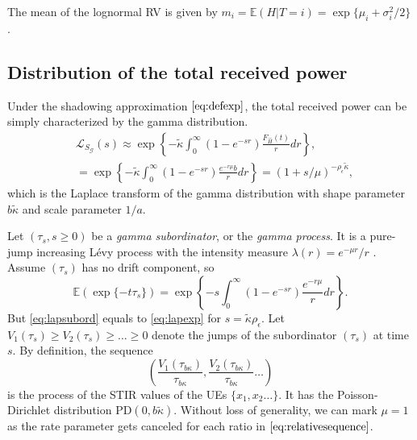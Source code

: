 \documentclass[lettersize,journal]{IEEEtran}
\begin{document}
The mean of the lognormal RV is given by $ m_i=\mathbb{E}(H|T=i) = \exp \{\mu_i+\sigma_i^2/2\}$.




\subsection{Distribution of the total received power}
Under the shadowing approximation $\eqref{eq:defexp}$, the total received power can be simply characterized by the gamma distribution.
\begin{align}
  \label{eq:lapexp}
  &\mathcal{L}_{S_{\mathcal{G}}}(s) \approx \exp\left\{-\mathcal{\tilde{\kappa}}\int_0^{\infty}(1-e^{-sr})\frac{F_{\hat{H}}(t)}{r} dr \right\}, \nonumber \\
  &= \exp\left\{-\mathcal{\tilde{\kappa}}\int_0^{\infty}(1-e^{-sr})\frac{e^{-r\mu}b}{r} dr \right\}=(1+s/\mu)^{-\rho_{\epsilon}\tilde{\kappa}}, 
\end{align}
which is the Laplace transform of the gamma distribution with shape parameter $b\tilde{\kappa}$ and scale parameter $1/a$.



Let $(\tau_s, s\geq 0)$ be a \textit{gamma subordinator}, or the \textit{gamma process}. It is a pure-jump increasing Lévy process with the intensity measure $\lambda(r) = e^{-\mu r}/r$ . Assume $(\tau_s)$ has no drift component, so
\begin{equation}
  \label{eq:lapsubord}
  \mathbb{E}(\exp\{-t \tau_s\}) = \exp\left\{-s \int_0^{\infty}(1-e^{-s r})\frac{e^{-r\mu}}{r} dr \right\}.
\end{equation}
But \eqref{eq:lapsubord} equals to \eqref{eq:lapexp} for $s=\tilde{\kappa}\rho_{\epsilon} $. Let $V_1(\tau_s) \geq V_2(\tau_s)\geq \dots \geq 0 $ denote the jumps of the subordinator $(\tau_s)$ at time $s$. By definition, the sequence
\begin{equation}
  \label{eq:relativesequence}
  \left(\frac{V_1(\tau_{b\kappa})}{\tau_{b\kappa}},\frac{V_2(\tau_{b\kappa})}{\tau_{b\kappa}} \dots \right)
\end{equation}
is the process of the STIR values of the UEs $\{x_1,x_2 \dots\}$. It has the Poisson-Dirichlet distribution PD$(0, b \tilde{\kappa})$. Without loss of generality, we can mark $\mu=1$ as the rate parameter gets canceled for each ratio in $\eqref{eq:relativesequence}$.
\end{document}
